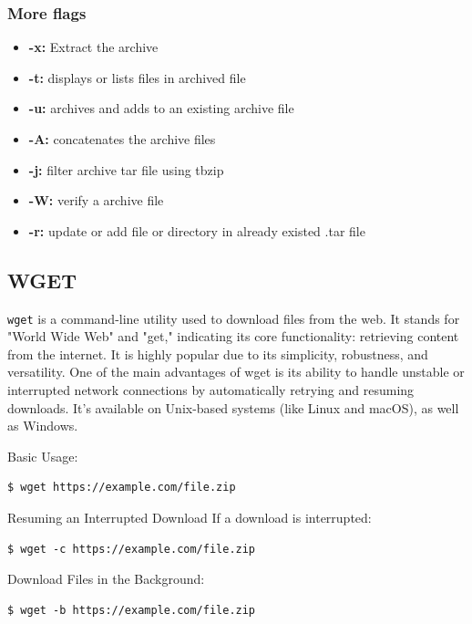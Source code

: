 \documentclass{article}
\newenvironment{codetemplate}[1][]{%
  \mybasecolorbox[#1]
  \itshape
}{%
  \endmybasecolorbox
}
\begin{document}
\subsubsection{More flags}
\begin{itemize}
    \item \textbf{-x:} Extract the archive 
    \item \textbf{-t:} displays or lists files in archived file 
    \item \textbf{-u:} archives and adds to an existing archive file 
    \item \textbf{-A:} concatenates the archive files 
    \item \textbf{-j:} filter archive tar file using tbzip
    \item \textbf{-W:} verify a archive file
    \item \textbf{-r:} update or add file or directory in already existed .tar file
\end{itemize}

\subsection{WGET}
\verb|wget| is a command-line utility used to download files from the web. It stands for "World Wide Web" and "get," indicating its core functionality: retrieving content from the internet. It is highly popular due to its simplicity, robustness, and versatility. One of the main advantages of wget is its ability to handle unstable or interrupted network connections by automatically retrying and resuming downloads. It's available on Unix-based systems (like Linux and macOS), as well as Windows.

Basic Usage:
\begin{codetemplate}{}
\begin{verbatim}
$ wget https://example.com/file.zip
\end{verbatim}
\end{codetemplate}

Resuming an Interrupted Download If a download is interrupted:
\begin{codetemplate}{}
\begin{verbatim}
$ wget -c https://example.com/file.zip
\end{verbatim}
\end{codetemplate}

Download Files in the Background:
\begin{codetemplate}{}
\begin{verbatim}
$ wget -b https://example.com/file.zip
\end{verbatim}
\end{codetemplate}
\end{document}
